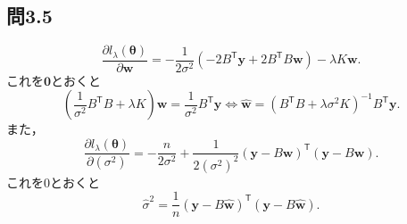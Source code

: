 \documentclass[pdflatex,ja=standard]{bxjsarticle}
\begin{document}
\subsection*{問3.5}
\begin{equation}
\frac{\partial l_{\lambda} (\bm{\theta}) }{\partial \bm{w}} = - \frac{1}{2 \sigma^2} ( -2 B^{\mathsf{T}} \bm{y} + 2 B^{\mathsf{T}} B \bm{w}) - \lambda K \bm{w}.
\end{equation}
これを$\bm{0}$とおくと
\begin{equation}
\left( \frac{1}{\sigma^2} B^{\mathsf{T}} B + \lambda K \right) \bm{w} = \frac{1}{\sigma^2} B^{\mathsf{T}} \bm{y}
\iff \hat{\bm{w}} = \left(B^{\mathsf{T}} B + \lambda \sigma^2  K \right)^{-1} B^{\mathsf{T}} \bm{y}.
\end{equation}
また，
\begin{equation}
\frac{\partial l_{\lambda} (\bm{\theta}) }{\partial (\sigma^2)} = - \frac{n}{2 \sigma^2} + \frac{1}{2 (\sigma^2)^2} (\bm{y} - B \bm{w})^{\mathsf{T}} (\bm{y} - B \bm{w}).
\end{equation}
これを0とおくと
\begin{equation}
\hat{\sigma}^2 = \frac{1}{n} (\bm{y} - B \hat{\bm{w}})^{\mathsf{T}} (\bm{y} - B \hat{\bm{w}}).
\end{equation}
\end{document}
